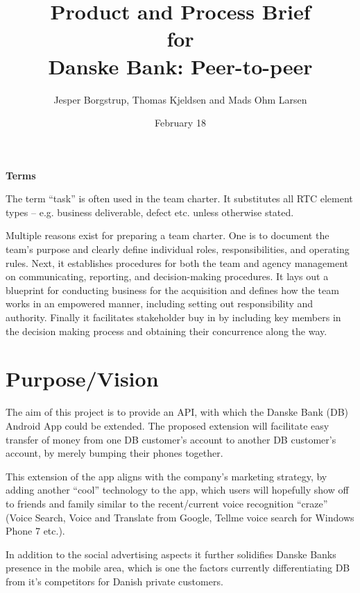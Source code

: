 \documentclass[a4paper,11pt]{article}
\title{Product and Process Brief\\\small{for}\\\small{Danske Bank: Peer-to-peer}}
\author{ Jesper Borgstrup, Thomas Kjeldsen and Mads Ohm Larsen }
\date{February 18}
\begin{document}
\ifpdf
{}
\else
{}
\fi

\maketitle

\tableofcontents
\vspace{2cm}

\noindent\textbf{Terms}

The term ``task'' is often used in the team charter. 
It substitutes all RTC element types – e.g. business deliverable, defect etc. unless otherwise stated.

\pagebreak
Multiple reasons exist for preparing a team charter. One is to document the team's purpose and clearly define individual roles, responsibilities, and operating rules. Next, it establishes procedures for both the team and agency management on communicating, reporting, and decision-making procedures. It lays out a blueprint for conducting business for the acquisition and defines how the team works in an empowered manner, including setting out responsibility and authority. Finally it facilitates stakeholder buy in by including key members in the decision making process and obtaining their concurrence along the way. 

\section{Purpose/Vision} %
\label{sec:purpose_vision}

The aim of this project is to provide an API, with which the Danske Bank (DB) Android App could be extended. The proposed extension will facilitate easy transfer of money from one DB customer's account to another DB customer's account, by merely bumping their phones together.

This extension of the app aligns with the company's marketing strategy, by adding another ``cool'' technology to the app, which users will hopefully show off to friends and family similar to the recent/current voice recognition ``craze'' (Voice Search, Voice and Translate from Google, Tellme voice search for Windows Phone 7 etc.).

In addition to the social advertising aspects it further solidifies Danske Banks presence in the mobile area, which is one the factors currently differentiating DB from it's competitors for Danish private customers. 
\end{document}
